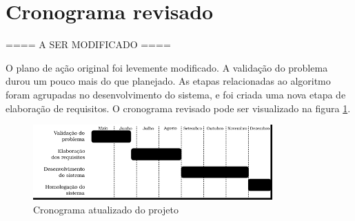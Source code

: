 \section{Cronograma revisado}


==== A SER MODIFICADO ====

O plano de ação original foi levemente modificado. A validação do problema durou um pouco mais do que planejado. As etapas relacionadas ao algoritmo foram agrupadas no desenvolvimento do sistema, e foi criada uma nova etapa de elaboração de requisitos. O cronograma revisado pode ser visualizado na figura \ref{fig-cronograma-atualizado}.

\begin{figure}[ht!]
    \begin{center}
    \includegraphics[width=260pt]{figuras/cronograma-atualizado}
    \caption{Cronograma atualizado do projeto}
    \label{fig-cronograma-atualizado}
    \end{center}
\end{figure}